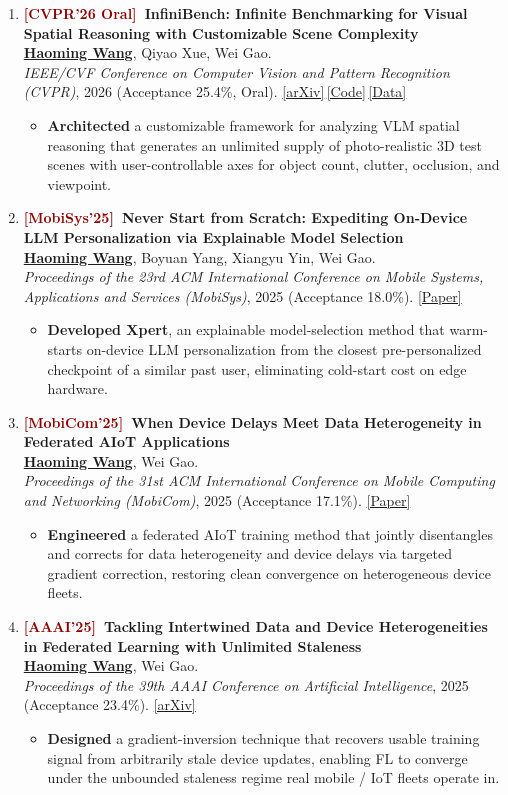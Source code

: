 \documentclass[11pt, letterpaper]{article}
\newenvironment{publist}{
  \begin{enumerate}[leftmargin=1.7em, itemsep=4pt, parsep=0pt, topsep=2pt, label=\arabic*.]
}{\end{enumerate}}
\newcommand{\impactbullet}[1]{%
  \par\vspace{1pt}%
  \begin{itemize}[leftmargin=1.2em, topsep=0pt, itemsep=0pt, parsep=0pt, partopsep=0pt]
    \item #1
  \end{itemize}}
\newcommand{\me}{\underline{\textbf{Haoming Wang}}}
\begin{document}
\begin{publist}
\item \textbf{\textcolor{darkred}{[CVPR'26 Oral]}\ InfiniBench: Infinite Benchmarking for Visual Spatial Reasoning with Customizable Scene Complexity}\\
\me, Qiyao Xue, Wei Gao.\\
\textit{IEEE/CVF Conference on Computer Vision and Pattern Recognition (CVPR)}, 2026 (Acceptance 25.4\%, Oral). \href{https://arxiv.org/abs/2511.18200}{[arXiv]}\,\href{https://github.com/pittisl/infinibench}{[Code]}\,\href{https://huggingface.co/datasets/Haoming645/infinibench}{[Data]}
\impactbullet{\textbf{Architected} a customizable framework for analyzing VLM spatial reasoning that generates an unlimited supply of photo-realistic 3D test scenes with user-controllable axes for object count, clutter, occlusion, and viewpoint.}

\item \textbf{\textcolor{darkred}{[MobiSys'25]}\ Never Start from Scratch: Expediting On-Device LLM Personalization via Explainable Model Selection}\\
\me, Boyuan Yang, Xiangyu Yin, Wei Gao.\\
\textit{Proceedings of the 23rd ACM International Conference on Mobile Systems, Applications and Services (MobiSys)}, 2025 (Acceptance 18.0\%). \href{https://haomingwang645.github.io/pdfs/xpert_paper.pdf}{[Paper]}
\impactbullet{\textbf{Developed Xpert}, an explainable model-selection method that warm-starts on-device LLM personalization from the closest pre-personalized checkpoint of a similar past user, eliminating cold-start cost on edge hardware.}

\item \textbf{\textcolor{darkred}{[MobiCom'25]}\ When Device Delays Meet Data Heterogeneity in Federated AIoT Applications}\\
\me, Wei Gao.\\
\textit{Proceedings of the 31st ACM International Conference on Mobile Computing and Networking (MobiCom)}, 2025 (Acceptance 17.1\%). \href{https://haomingwang645.github.io/pdfs/feddc_paper.pdf}{[Paper]}
\impactbullet{\textbf{Engineered} a federated AIoT training method that jointly disentangles and corrects for data heterogeneity and device delays via targeted gradient correction, restoring clean convergence on heterogeneous device fleets.}

\item \textbf{\textcolor{darkred}{[AAAI'25]}\ Tackling Intertwined Data and Device Heterogeneities in Federated Learning with Unlimited Staleness}\\
\me, Wei Gao.\\
\textit{Proceedings of the 39th AAAI Conference on Artificial Intelligence}, 2025 (Acceptance 23.4\%). \href{https://arxiv.org/abs/2309.13536}{[arXiv]}
\impactbullet{\textbf{Designed} a gradient-inversion technique that recovers usable training signal from arbitrarily stale device updates, enabling FL to converge under the unbounded staleness regime real mobile / IoT fleets operate in.}
\end{publist}
\end{document}
